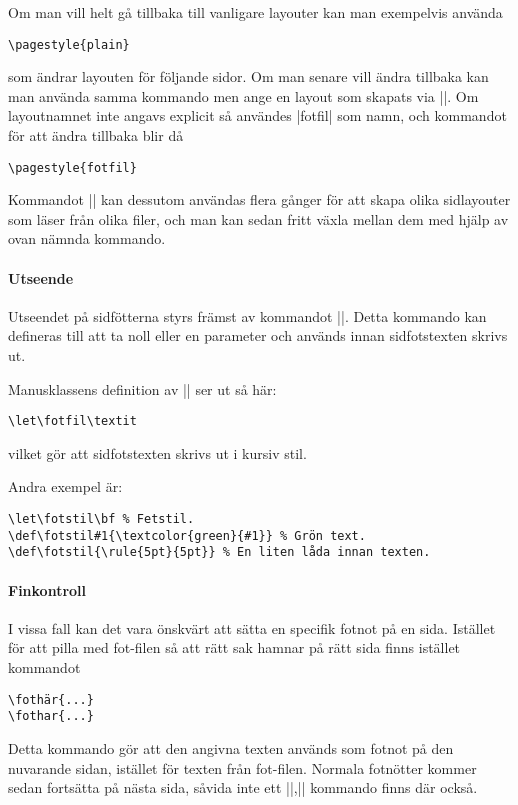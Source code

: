 \documentclass[a4paper,12pt]{article}
\begin{document}
Om man vill helt gå tillbaka till vanligare layouter kan man exempelvis använda
\begin{lstlisting}
\pagestyle{plain}
\end{lstlisting}
som ändrar layouten för följande sidor. Om man senare vill ändra tillbaka kan man använda samma kommando men ange en layout som skapats via |\fotfil|. Om layoutnamnet inte angavs explicit så användes |fotfil| som namn, och kommandot för att ändra tillbaka blir då
\begin{lstlisting}[keywords={pagestyle}]
\pagestyle{fotfil}
\end{lstlisting}

Kommandot |\fotfil| kan dessutom användas flera gånger för att skapa olika sidlayouter som läser från olika filer, och man kan sedan fritt växla mellan dem med hjälp av ovan nämnda kommando.

\paragraph{Utseende} Utseendet på sidfötterna styrs främst av kommandot |\fotstil|. Detta kommando kan defineras till att ta noll eller en parameter och används innan sidfotstexten skrivs ut.

Manusklassens definition av |\fotstil| ser ut så här:
\begin{lstlisting}
\let\fotfil\textit
\end{lstlisting}
vilket gör att sidfotstexten skrivs ut i kursiv stil.

Andra exempel är:
\begin{lstlisting}
\let\fotstil\bf % Fetstil.
\def\fotstil#1{\textcolor{green}{#1}} % Grön text.
\def\fotstil{\rule{5pt}{5pt}} % En liten låda innan texten.
\end{lstlisting}

\paragraph{Finkontroll} I vissa fall kan det vara önskvärt att sätta en specifik fotnot på en sida. Istället för att pilla med fot-filen så att rätt sak hamnar på rätt sida finns istället kommandot

\begin{lstlisting}
\fothär{...}
\fothar{...}
\end{lstlisting}

Detta kommando gör att den angivna texten används som fotnot på den nuvarande sidan, istället för texten från fot-filen. Normala fotnötter kommer sedan fortsätta på nästa sida, såvida inte ett ||,|\fothar| kommando finns där också.
\end{document}
